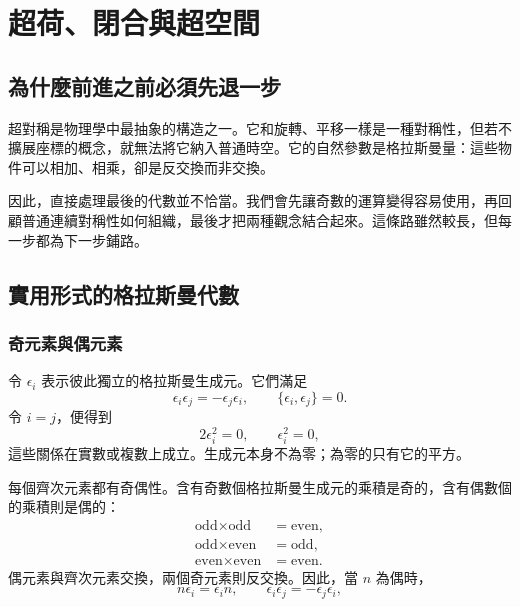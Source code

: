 \chapter{超荷、閉合與超空間}


\section{為什麼前進之前必須先退一步}

超對稱是物理學中最抽象的構造之一。它和旋轉、平移一樣是一種對稱性，但若不擴展座標的概念，就無法將它納入普通時空。它的自然參數是格拉斯曼量：這些物件可以相加、相乘，卻是反交換而非交換。

因此，直接處理最後的代數並不恰當。我們會先讓奇數的運算變得容易使用，再回顧普通連續對稱性如何組織，最後才把兩種觀念結合起來。這條路雖然較長，但每一步都為下一步鋪路。

\section{實用形式的格拉斯曼代數}

\subsection{奇元素與偶元素}

令 \(\epsilon_i\) 表示彼此獨立的格拉斯曼生成元。它們滿足
\begin{equation}
\epsilon_i\epsilon_j=-\epsilon_j\epsilon_i,
\qquad
\{\epsilon_i,\epsilon_j\}=0.
\end{equation}
令 \(i=j\)，便得到
\begin{equation}
2\epsilon_i^2=0,
\qquad
\epsilon_i^2=0,
\end{equation}
這些關係在實數或複數上成立。生成元本身不為零；為零的只有它的平方。

每個齊次元素都有奇偶性。含有奇數個格拉斯曼生成元的乘積是奇的，含有偶數個的乘積則是偶的：
\begin{align}
\text{odd}\times\text{odd}&=\text{even},\\
\text{odd}\times\text{even}&=\text{odd},\\
\text{even}\times\text{even}&=\text{even}.
\end{align}
偶元素與齊次元素交換，兩個奇元素則反交換。因此，當 \(n\) 為偶時，
\begin{equation}
n\epsilon_i=\epsilon_i n,
\qquad
\epsilon_i\epsilon_j=-\epsilon_j\epsilon_i,
\end{equation}

